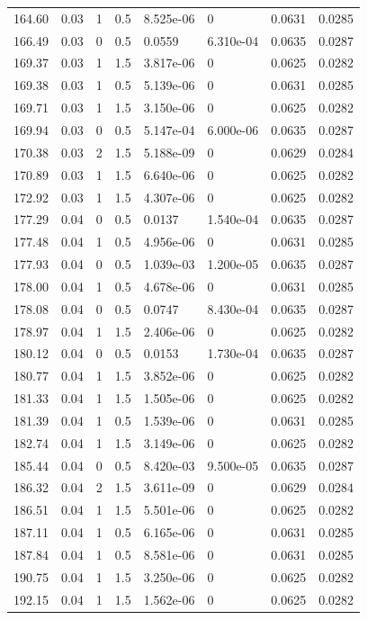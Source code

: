 \documentclass[preview]{standalone}
\begin{document}
{{{\begin{tabular}{L{1.2cm}C{1.2cm} C{0.3cm}C{0.5cm} C{1.4cm}C{1.4cm} C{1.4cm}C{1.4cm}}
  164.60  &  0.03  & 1     & 0.5 &  8.525e-06  & 0  & 0.0631 &  0.0285   \\ 
  166.49  &  0.03  & 0     & 0.5 &  0.0559  & 6.310e-04  & 0.0635 &  0.0287   \\ 
  169.37  &  0.03  & 1     & 1.5 &  3.817e-06  & 0  & 0.0625 &  0.0282   \\ 
  169.38  &  0.03  & 1     & 0.5 &  5.139e-06  & 0  & 0.0631 &  0.0285   \\ 
  169.71  &  0.03  & 1     & 1.5 &  3.150e-06  & 0  & 0.0625 &  0.0282   \\ 
  169.94  &  0.03  & 0     & 0.5 &  5.147e-04  & 6.000e-06  & 0.0635 &  0.0287   \\ 
  170.38  &  0.03  & 2     & 1.5 &  5.188e-09  & 0  & 0.0629 &  0.0284   \\ 
  170.89  &  0.03  & 1     & 1.5 &  6.640e-06  & 0  & 0.0625 &  0.0282   \\ 
  172.92  &  0.03  & 1     & 1.5 &  4.307e-06  & 0  & 0.0625 &  0.0282   \\ 
  177.29  &  0.04  & 0     & 0.5 &  0.0137  & 1.540e-04  & 0.0635 &  0.0287   \\ 
  177.48  &  0.04  & 1     & 0.5 &  4.956e-06  & 0  & 0.0631 &  0.0285   \\ 
  177.93  &  0.04  & 0     & 0.5 &  1.039e-03  & 1.200e-05  & 0.0635 &  0.0287   \\ 
  178.00  &  0.04  & 1     & 0.5 &  4.678e-06  & 0  & 0.0631 &  0.0285   \\ 
  178.08  &  0.04  & 0     & 0.5 &  0.0747  & 8.430e-04  & 0.0635 &  0.0287   \\ 
  178.97  &  0.04  & 1     & 1.5 &  2.406e-06  & 0  & 0.0625 &  0.0282   \\ 
  180.12  &  0.04  & 0     & 0.5 &  0.0153  & 1.730e-04  & 0.0635 &  0.0287   \\ 
  180.77  &  0.04  & 1     & 1.5 &  3.852e-06  & 0  & 0.0625 &  0.0282   \\ 
  181.33  &  0.04  & 1     & 1.5 &  1.505e-06  & 0  & 0.0625 &  0.0282   \\ 
  181.39  &  0.04  & 1     & 0.5 &  1.539e-06  & 0  & 0.0631 &  0.0285   \\ 
  182.74  &  0.04  & 1     & 1.5 &  3.149e-06  & 0  & 0.0625 &  0.0282   \\ 
  185.44  &  0.04  & 0     & 0.5 &  8.420e-03  & 9.500e-05  & 0.0635 &  0.0287   \\ 
  186.32  &  0.04  & 2     & 1.5 &  3.611e-09  & 0  & 0.0629 &  0.0284   \\ 
  186.51  &  0.04  & 1     & 1.5 &  5.501e-06  & 0  & 0.0625 &  0.0282   \\ 
  187.11  &  0.04  & 1     & 0.5 &  6.165e-06  & 0  & 0.0631 &  0.0285   \\ 
  187.84  &  0.04  & 1     & 0.5 &  8.581e-06  & 0  & 0.0631 &  0.0285   \\ 
  190.75  &  0.04  & 1     & 1.5 &  3.250e-06  & 0  & 0.0625 &  0.0282   \\ 
  192.15  &  0.04  & 1     & 1.5 &  1.562e-06  & 0  & 0.0625 &  0.0282   \\ 
\hline 
\end{tabular} 

}}}
\end{document}
